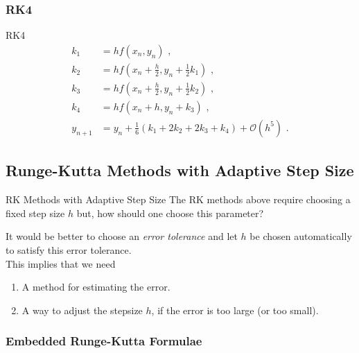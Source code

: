 \documentclass[11pt]{beamer}
\begin{document}
\subsubsection{RK4}
\begin{frame}[fragile]{RK4}
\begin{align}
k_1 &=h f(x_n,y_n)\,\,,\\
k_2 &=h f(x_n + \frac{h}{2},y_n + \frac{1}{2}k_1)\,\,,\nonumber\\
k_3 &=h f(x_n + \frac{h}{2},y_n + \frac{1}{2}k_2)\,\,,\nonumber\\
k_4 &=h f(x_n+h,y_n + k_3)\,\,,\nonumber\\
y_{n+1} &= y_n + \frac{1}{6}(k_1 + 2 k_2 + 2 k_3 + k_4) + \mathcal{O}(h^5)\,\,.
\end{align}
\end{frame}

\subsection{Runge-Kutta Methods with Adaptive Step Size}
\begin{frame}[fragile]{RK Methods with Adaptive Step Size}
The RK methods above require choosing a fixed step
size $h$ but, how should one choose this parameter? 

It would be better to choose an \emph{error tolerance} and let $h$ be chosen
automatically to satisfy this error tolerance. \\

This implies that  we need

\begin{enumerate}
\item A method for estimating the error.
\item A way to adjust the stepsize $h$, if the error is too large (or too small).
\end{enumerate}
\end{frame}

\subsubsection{Embedded Runge-Kutta Formulae}
\end{document}
